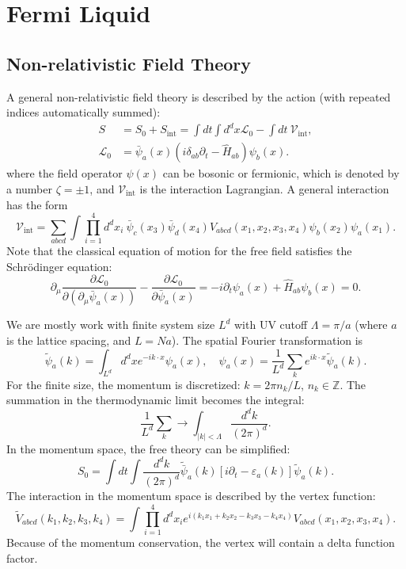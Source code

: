 \chapter{Fermi Liquid}


\section{Non-relativistic Field Theory}
A general non-relativistic field theory is described by the action (with repeated indices automatically summed):
\begin{equation}
\begin{aligned}
	S &= S_0 + S_{\mathrm{int}} = \int dt \int d^d x \mathcal{L}_0 - \int dt\ \mathcal{V}_{\mathrm{int}}, \\
	\mathcal{L}_0 &= \bar\psi_a(x) (i\delta_{ab}\partial_t-\hat H_{ab})\psi_b(x).
\end{aligned}
\end{equation}
where the field operator $\psi(x)$ can be bosonic or fermionic, which is denoted by a number $\zeta=\pm 1$, and $\mathcal{V}_{\mathrm{int}}$ is the interaction Lagrangian.
A general interaction has the form
\begin{equation}
	\mathcal{V}_{\mathrm{int}} = \sum_{abcd}\int \prod_{i=1}^4 d^d x_i \ \bar\psi_{c}(x_3)\bar\psi_{d}(x_4) V_{abcd}(x_1,x_2,x_3,x_4) \psi_{b}(x_2)\psi_{a}(x_1).
\end{equation}
Note that the classical equation of motion for the free field satisfies the Schr\"{o}dinger equation:
\begin{equation}
	\partial_\mu \frac{\partial \mathcal L_0}{\partial(\partial_\mu \bar\psi_a(x))} - \frac{\partial \mathcal L_0}{\partial\bar{\psi}_a(x)} 
	= - i\partial_t \psi_a(x) + \hat H_{ab}\psi_b(x) = 0.
\end{equation}

We are mostly work with finite system size $L^d$ with UV cutoff $\Lambda = \pi/a$ (where $a$ is the lattice spacing, and $L = Na$). The spatial Fourier transformation is
\begin{equation}
	\tilde{\psi}_a(k) = \int_{L^d} d^dx e^{-i k \cdot x}\psi_a(x), \quad
	\psi_a(x) = \frac{1}{L^d}\sum_{k} e^{i k \cdot x}\tilde{\psi}_a(k).
\end{equation}
For the finite size, the momentum is discretized: $k = 2\pi n_k/L$, $n_k \in \mathbb Z$.
The summation in the thermodynamic limit becomes the integral:
\begin{equation}
	\frac{1}{L^d}\sum_k \longrightarrow \int_{|k|<\Lambda} \frac{d^dk}{(2\pi)^d}.
\end{equation}
In the momentum space, the free theory can be simplified:
\begin{equation}
	S_0 = \int dt \int \frac{d^d k}{(2\pi)^d} \tilde{\bar\psi}_a(k) [i\partial_t-\varepsilon_a(k)]\tilde{\psi}_a(k).
\end{equation}
The interaction in the momentum space is described by the vertex function:
\begin{equation}
	\tilde V_{abcd}(k_1,k_2,k_3,k_4)
	= \int \prod_{i=1}^4 d^d x_i e^{i(k_1x_1+k_2x_2-k_3x_3-k_4x_4)} V_{abcd}(x_1,x_2,x_3,x_4).
\end{equation}
Because of the momentum conservation, the vertex will contain a delta function factor.


